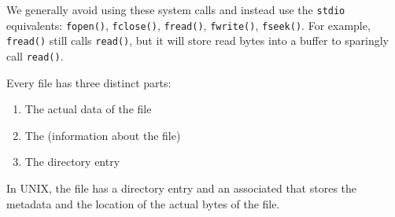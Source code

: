 \documentclass[code]{amznotes}
\begin{document}
\begin{notebox}
    We generally avoid using these system calls and instead use the \texttt{stdio} equivalents: \texttt{fopen()}, \texttt{fclose()}, \texttt{fread()}, \texttt{fwrite()}, \texttt{fseek()}. For example, \texttt{fread()} still calls \texttt{read()}, but it will store read bytes into a buffer to sparingly call \texttt{read()}.
\end{notebox}

Every file has three distinct parts:
\begin{enumerate}[noitemsep]
    \item The actual data of the file
    \item The  (information about the file)
    \item The directory entry
\end{enumerate}

In UNIX, the file has a directory entry and an associated  that stores the metadata and the location of the actual bytes of the file.



\end{document}
